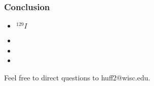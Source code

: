 
\begin{frame}[ctb!]
  \frametitle{Conclusion}
\footnotesize{
  \begin{itemize}
    \item $^{129}I$
    \item
    \item
    \item
  \end{itemize}
  
  Feel free to direct questions to huff2@wisc.edu.
}
\end{frame}
